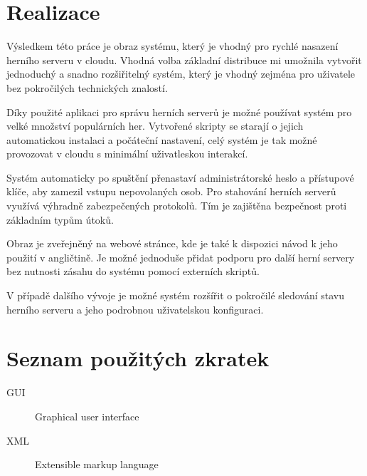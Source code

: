 \documentclass[thesis=B,czech]{FITthesis}[2019/12/23]
\begin{document}

    
\chapter{Realizace}

\begin{conclusion}
    Výsledkem této práce je obraz systému, který je vhodný pro rychlé nasazení herního serveru v cloudu.
    Vhodná volba základní distribuce mi umožnila vytvořit jednoduchý a snadno rozšiřitelný systém,
    který je vhodný zejména pro uživatele bez pokročilých technických znalostí.

    Díky použité aplikaci pro správu herních serverů je možné používat systém pro velké množství populárních her.
    Vytvořené skripty se starají o jejich automatickou instalaci a počáteční nastavení, celý systém je tak
    možné provozovat v cloudu s minimální uživatleskou interakcí.

    Systém automaticky po spuštění přenastaví administrátorské heslo a přístupové klíče, aby zamezil vstupu
    nepovolaných osob. Pro stahování herních serverů využívá výhradně zabezpečených protokolů.
    Tím je zajištěna bezpečnost proti základním typům útoků.

    Obraz je zveřejněný na webové stránce, kde je také k dispozici návod k jeho použití v angličtině.
    Je možné jednoduše přidat podporu pro další herní servery bez nutnosti zásahu do systému pomocí externích skriptů.

    V případě dalšího vývoje je možné systém rozšířit o pokročilé sledování stavu herního serveru a jeho
    podrobnou uživatelskou konfiguraci.
\end{conclusion}

% 
% 

\printbibliography

\appendix

\chapter{Seznam použitých zkratek}
\begin{description}
	\item[GUI] Graphical user interface
	\item[XML] Extensible markup language
\end{description}
\end{document}
